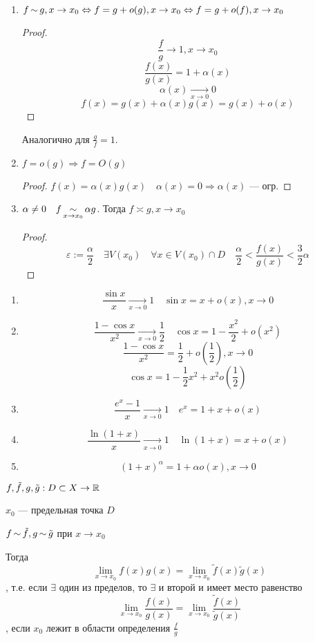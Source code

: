     \begin{consequence}
        \begin{enumerate}
            \item $f\operatorname*{\sim} g, x\to x_0 \Leftrightarrow f=g+o(g), x\to x_0 \Leftrightarrow f=g+o(f), x\to x_0$
            \begin{proof}
                $$\frac{f}{g}\to1, x\to x_0$$
                $$\frac{f(x)}{g(x)}=1+\alpha(x)$$
                $$\alpha(x)\xrightarrow[x\to0]{} 0$$
                $$f(x)=g(x)+\alpha(x)g(x)=g(x)+o(x)$$
            \end{proof}
            Аналогично для $\frac{g}{f}=1$.

            \item $f=o(g) \Rightarrow f=O(g)$
            \begin{proof}
                $f(x)=\alpha(x)g(x) \quad \alpha(x)=0\Rightarrow \alpha(x)$ --- огр.
            \end{proof}
            \item $\alpha\not=0 \quad f\operatorname*{\sim}\limits_{x\to x_0}\alpha g$. Тогда $f\asymp g, x\to x_0$
            \begin{proof}
                $$\varepsilon:=\frac{\alpha}{2} \quad \exists V(x_0) \quad \forall x\in V(x_0)\cap D \quad \frac{\alpha}{2}<\frac{f(x)}{g(x)}<\frac{3}{2}\alpha$$
            \end{proof}
        \end{enumerate}
    \end{consequence}
    \begin{example}
        \begin{enumerate}
            \item $$\frac{\sin x}{x}\xrightarrow[x\to0]{} 1 \quad \sin x = x + o(x), x\to 0$$
            \item $$\frac{1 - \cos x}{x^2}\xrightarrow[x\to0]{} \frac{1}{2} \quad \cos x = 1-\frac{x^2}{2}+o(x^2)$$
            $$\frac{1-\cos x}{x^2}=\frac{1}{2}+o(\frac{1}{2}), x\to 0$$
            $$\cos x=1-\frac{1}{2}x^2+x^2o(\frac{1}{2})$$
            \item $$\frac{e^x-1}{x}\xrightarrow[x\to0]{} 1 \quad e^x=1+x+o(x)$$
            \item $$\frac{\ln(1+x)}{x}\xrightarrow[x\to0]{} 1 \quad \ln(1+x)=x+o(x)$$
            \item $$(1+x)^\alpha=1+\alpha o(x), x\to 0$$
        \end{enumerate}
    \end{example}
    \begin{theorem}
        $f,\tilde f, g, \tilde g:D\subset X \to \operatorname*{\mathbb{R}}$

        $x_0$ --- предельная точка $D$

        $f\operatorname*{\sim} \tilde f, g\operatorname*{\sim} \tilde g$ при $x\to x_0$

        Тогда $$\lim\limits_{x\to x_0} f(x)g(x)=\lim\limits_{x\to x_0}\tilde f(x)\tilde g(x)$$
        , т.е. если $\exists$ один из пределов, то $\exists$ и второй и имеет место равенство $$\lim\limits_{x\to x_0} \frac{f(x)}{g(x)} = \lim\limits_{x\to x_0} \frac{\tilde f(x)}{\tilde g(x)}$$
        , если $x_0$ лежит в области определения $\frac{f}{g}$
    \end{theorem}
